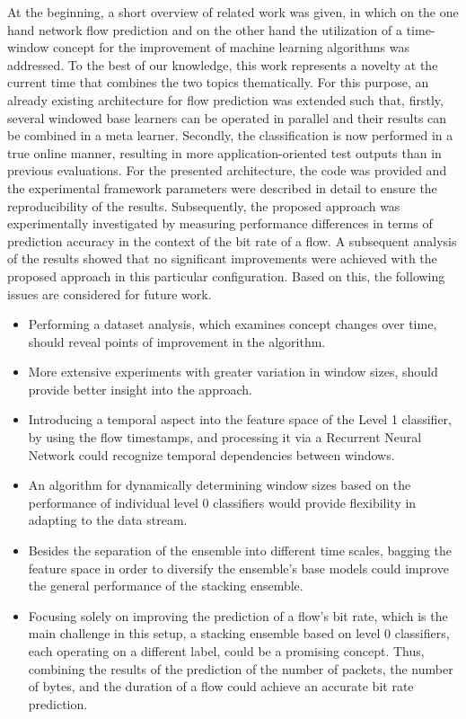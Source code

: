 \documentclass[conference]{IEEEtran}
\begin{document}
At the beginning, a short overview of related work was given, in which on the one hand network flow prediction and on the other hand the utilization of a time-window concept for the improvement of machine learning algorithms was addressed. To the best of our knowledge, this work represents a novelty at the current time that combines the two topics thematically. For this purpose, an already existing architecture for flow prediction was extended such that, firstly, several windowed base learners can be operated in parallel and their results can be combined in a meta learner. Secondly, the classification is now performed in a true online manner, resulting in more application-oriented test outputs than in previous evaluations. For the presented architecture, the code was provided and the experimental framework parameters were described in detail to ensure the reproducibility of the results. Subsequently, the proposed approach was experimentally investigated by measuring performance differences in terms of prediction accuracy in the context of the bit rate of a flow. A subsequent analysis of the results showed that no significant improvements were achieved with the proposed approach in this particular configuration. Based on this, the following issues are considered for future work.

\begin{itemize}
    \item Performing a dataset analysis, which examines concept changes over time, should reveal points of improvement in the algorithm.
    \item More extensive experiments with greater variation in window sizes, should provide better insight into the approach.
    \item Introducing a temporal aspect into the feature space of the Level 1 classifier, by using the flow timestamps, and processing it via a Recurrent Neural Network could recognize temporal dependencies between windows.
    \item An algorithm for dynamically determining window sizes based on the performance of individual level 0 classifiers would provide flexibility in adapting to the data stream. 
    \item Besides the separation of the ensemble into different time scales, bagging the feature space in order to diversify the ensemble's base models could improve the general performance of the stacking ensemble.
    \item Focusing solely on improving the prediction of a flow's bit rate, which is the main challenge in this setup, a stacking ensemble based on level 0 classifiers, each operating on a different label, could be a promising concept. Thus, combining the results of the prediction of the number of packets, the number of bytes, and the duration of a flow could achieve an accurate bit rate prediction.
\end{itemize}

\newpage



\end{document}

